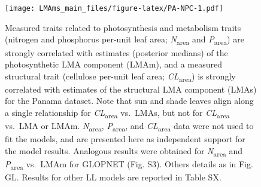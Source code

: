 \documentclass[
  12pt,
]{article}
\providecommand{\DIFaddbeginFL}{} %
\providecommand{\DIFaddendFL}{} %
\providecommand{\DIFdelbeginFL}{} %
\providecommand{\DIFdelendFL}{} %
\newcommand{\DIFscaledelfig}{0.5}
\newlength{\DIFdelgraphicswidth} %
\newlength{\DIFdelgraphicsheight} %
\newcommand{\DIFaddincludegraphics}[2][]{{\color{blue}\fbox{\DIFOincludegraphics[#1]{#2}}}} %
\newcommand{\DIFdelincludegraphics}[2][]{%
\sbox{\DIFdelgraphicsbox}{\DIFOincludegraphics[#1]{#2}}%
\settoboxwidth{\DIFdelgraphicswidth}{\DIFdelgraphicsbox} %
\settoboxtotalheight{\DIFdelgraphicsheight}{\DIFdelgraphicsbox} %
\scalebox{\DIFscaledelfig}{%
\parbox[b]{\DIFdelgraphicswidth}{\usebox{\DIFdelgraphicsbox}\\[-\baselineskip] \rule{\DIFdelgraphicswidth}{0em}}\llap{\resizebox{\DIFdelgraphicswidth}{\DIFdelgraphicsheight}{%
\setlength{\unitlength}{\DIFdelgraphicswidth}%
\begin{picture}(1,1)%
\thicklines\linethickness{2pt} %
{\color[rgb]{1,0,0}\put(0,0){\framebox(1,1){}}}%
{\color[rgb]{1,0,0}\put(0,0){\line( 1,1){1}}}%
{\color[rgb]{1,0,0}\put(0,1){\line(1,-1){1}}}%
\end{picture}%
}\hspace*{3pt}}} %
} %
\DeclareRobustCommand{\DIFaddbeginFL}{\DIFOaddbeginFL \let\includegraphics\DIFaddincludegraphics} %
\DeclareRobustCommand{\DIFaddendFL}{\DIFOaddendFL \let\includegraphics\DIFOincludegraphics} %
\DeclareRobustCommand{\DIFdelbeginFL}{\DIFOdelbeginFL \let\includegraphics\DIFdelincludegraphics} %
\DeclareRobustCommand{\DIFdelendFL}{\DIFOaddendFL \let\includegraphics\DIFOincludegraphics} %
\begin{document}
\newpage

\hypertarget{section-7}{%
\section{}\label{section-7}}

\begin{figure}
\centering
\DIFdelbeginFL %
\DIFdelendFL \DIFaddbeginFL \texttt{[image: LMAms\_main\_files/figure-latex/PA-NPC-1.pdf]}
\DIFaddendFL \caption{\label{fig:PA-NPC}Measured traits related to photosynthesis and metabolism traits (nitrogen and phosphorus per-unit leaf area; \emph{N}\textsubscript{area} and \emph{P}\textsubscript{area}) are strongly correlated with estimates (posterior medians) of the photosynthetic LMA component (LMAm), and a measured structural trait (cellulose per-unit leaf area; \emph{CL}\textsubscript{area}) is strongly correlated with estimates of the structural LMA component (LMAs) for the Panama dataset. Note that sun and shade leaves align along a single relationship for \emph{CL}\textsubscript{area} vs.~LMAs, but not for \emph{CL}\textsubscript{area} vs.~LMA or LMAm. \emph{N}\textsubscript{area}, \emph{P}\textsubscript{area}, and \emph{CL}\textsubscript{area} data were not used to fit the models, and are presented here as independent support for the model results. Analogous results were obtained for \emph{N}\textsubscript{area} and \emph{P}\textsubscript{area} vs.~LMAm for GLOPNET (Fig. S3). Others details as in Fig. GL. Results for other LL models are reported in Table SX.}
\end{figure}
\end{document}

